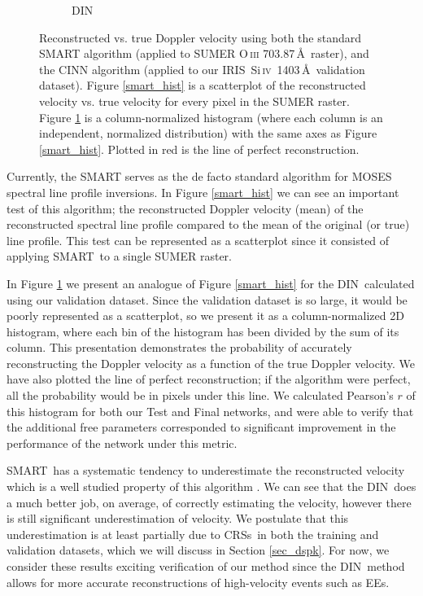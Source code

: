 \documentclass[10pt,letterpaper, doublespace]{article}
\newcommand{\SiIV}{Si\,\textsc{iv}~1403\,\AA}
\newcommand{\OIII}{O\,\textsc{iii} 703.87\,\AA}
\newcommand{\EEs}{\acp{EE}}
\newcommand{\SMART}{\ac{SMART}}
\newcommand{\DIN}{\ac{DIN}}
\newcommand{\IRIS}{\ac{IRIS}}
\newcommand{\CRSs}{\acp{CRS}}
\begin{document}
\begin{figure}[t!]
\begin{subfigure}[t]{0.45\textwidth}
					\caption{DIN}
					\label{din_hist}
				\end{subfigure}
				\caption{Reconstructed vs. true Doppler velocity using both the standard SMART algorithm (applied to SUMER \OIII\ raster)\citep{Kankelborg2004}, and the CINN algorithm (applied to our \IRIS\ \SiIV\ validation dataset). 
					Figure \ref{smart_hist} is a scatterplot of the reconstructed velocity vs. true velocity for every pixel in the SUMER raster. 
					Figure \ref{din_hist} is a column-normalized histogram (where each column is an independent, normalized distribution) with the same axes as Figure \ref{smart_hist}. 
					Plotted in red is the line of perfect reconstruction.
					}
				\label{dopp_hist}
			\end{figure}

			Currently, the \SMART\citep{fox1} serves as the de facto standard algorithm for MOSES spectral line profile inversions.
			In Figure \ref{smart_hist} we can see an important test of this algorithm; the reconstructed Doppler velocity (mean) of the reconstructed spectral line profile compared to the mean of the original (or true) line profile.
			This test can be represented as a scatterplot since it consisted of applying \SMART\ to a single SUMER raster.
			
			In Figure \ref{din_hist} we present an analogue of Figure \ref{smart_hist} for the \DIN\ calculated using our validation dataset.
			Since the validation dataset is so large, it would be poorly represented as a scatterplot, so we present it as a column-normalized 2D histogram, where each bin of the histogram has been divided by the sum of its column.
			This presentation demonstrates the probability of accurately reconstructing the Doppler velocity as a function of the true Doppler velocity.
			We have also plotted the line of perfect reconstruction; if the algorithm were perfect, all the probability would be in pixels under this line.
			We calculated Pearson's $r$ of this histogram for both our Test and Final networks, and were able to verify that the additional free parameters corresponded to significant improvement in the performance of the network under this metric.
			
			\SMART\ has a systematic tendency to underestimate the reconstructed velocity which is a well studied property of this algorithm \citep{Fox2011,Rust2017}.
			We can see that the \DIN\ does a much better job, on average, of correctly estimating the velocity, however there is still significant underestimation of velocity.
			We postulate that this underestimation is at least partially due to \CRSs\ in both the training and validation datasets, which we will discuss in Section \ref{sec_dspk}.
			For now, we consider these results exciting verification of our method since the \DIN\ method allows for more accurate reconstructions of high-velocity events such as \EEs.		
						
\end{document}
